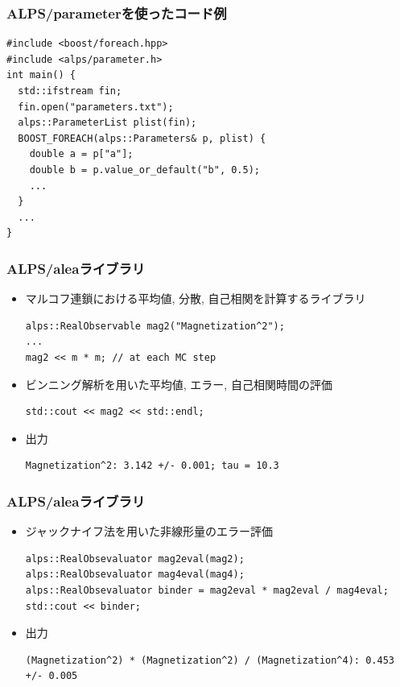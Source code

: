 \begin{frame}[t,fragile]
  \frametitle{ALPS/parameterを使ったコード例}
  \begin{lstlisting}
#include <boost/foreach.hpp>
#include <alps/parameter.h>
int main() {
  std::ifstream fin;
  fin.open("parameters.txt");
  alps::ParameterList plist(fin);
  BOOST_FOREACH(alps::Parameters& p, plist) {
    double a = p["a"];
    double b = p.value_or_default("b", 0.5);
    ...
  }
  ...
}
\end{lstlisting}
\end{frame}

\begin{frame}[t,fragile]
  \frametitle{ALPS/aleaライブラリ}
  \begin{itemize}
  \item マルコフ連鎖における平均値, 分散, 自己相関を計算するライブラリ
    \begin{lstlisting}
alps::RealObservable mag2("Magnetization^2");
...
mag2 << m * m; // at each MC step
\end{lstlisting}
  \item ビンニング解析を用いた平均値, エラー, 自己相関時間の評価
    \begin{lstlisting}
std::cout << mag2 << std::endl;
\end{lstlisting}
  \item 出力
\begin{lstlisting}
Magnetization^2: 3.142 +/- 0.001; tau = 10.3
\end{lstlisting}
  \end{itemize}
\end{frame}

\begin{frame}[t,fragile]
  \frametitle{ALPS/aleaライブラリ}
  \begin{itemize}
  \item ジャックナイフ法を用いた非線形量のエラー評価
    \begin{lstlisting}
alps::RealObsevaluator mag2eval(mag2);
alps::RealObsevaluator mag4eval(mag4);
alps::RealObsevaluator binder = mag2eval * mag2eval / mag4eval;
std::cout << binder;
\end{lstlisting}
  \item 出力
\begin{lstlisting}
(Magnetization^2) * (Magnetization^2) / (Magnetization^4): 0.453 +/- 0.005
\end{lstlisting}
  \end{itemize}
\end{frame}

